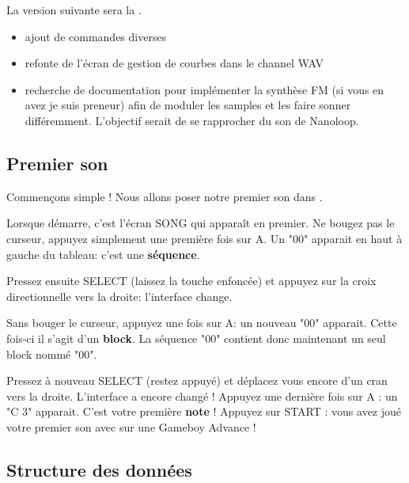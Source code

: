 La version suivante sera la \fatnextversion. \medskip
\begin{itemize}
  \item{ajout de commandes diverses}
  \item{refonte de l'écran de gestion de courbes dans le channel WAV}
  \item{recherche de documentation pour implémenter la synthèse FM (si vous en avez je suis preneur) afin de moduler les samples et les faire sonner différemment.
              L'objectif serait de se rapprocher du son de Nanoloop.}
\end{itemize}

\subsection{Premier son}

Commençons simple ! Nous allons poser notre premier son dans \FAT.\medskip

Lorsque \FAT démarre, c'est l'écran SONG qui apparaît en premier.
Ne bougez pas le curseur, appuyez simplement une première fois sur A.
Un "00" apparait en haut à gauche du tableau: c'est une {\bf séquence}.


Pressez ensuite SELECT (laissez la touche enfoncée) et appuyez sur la croix directionnelle vers la droite: l'interface change.


Sans bouger le curseur, appuyez une fois sur A: un nouveau "00" apparait.
Cette fois-ci il s'agit d'un {\bf block}. La séquence "00" contient donc maintenant un seul block nommé "00".


Pressez à nouveau SELECT (restez appuyé) et déplacez vous encore d'un cran vers la droite.
L'interface a encore changé !
Appuyez une dernière fois sur A : un "C 3" apparait.
C'est votre première {\bf note} !
Appuyez sur START : vous avez joué votre premier son avec \FAT sur une Gameboy Advance !


\subsection{Structure des données}

